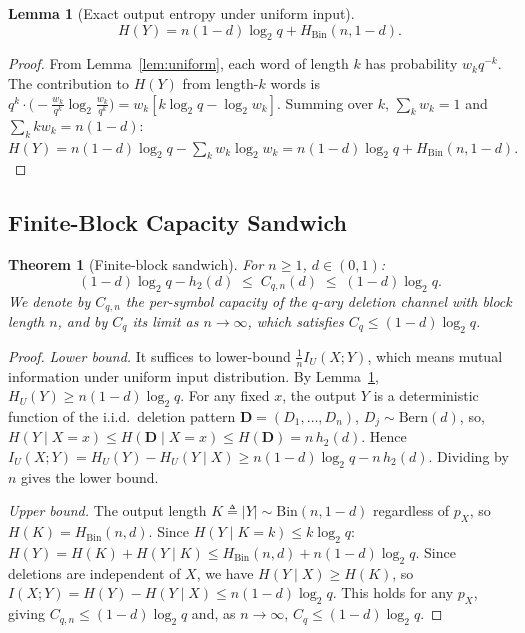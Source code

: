 \documentclass[conference]{IEEEtran}
\newtheorem{theorem}{Theorem}
\newtheorem{lemma}{Lemma}
\begin{document}
\begin{lemma}[Exact output entropy under uniform input]
\label{thm:HY}
\begin{equation}
  H(Y)=n(1-d)\log_2 q+H_{\mathrm{Bin}}(n,1-d).
  \label{eq:HY}
\end{equation}
\end{lemma}

\begin{proof}
From Lemma~\ref{lem:uniform}, each word of length $k$ has probability
$w_k q^{-k}$.  The contribution to $H(Y)$ from length-$k$ words is
$q^k\cdot\bigl(-\frac{w_k}{q^k}\log_2\frac{w_k}{q^k}\bigr)
=w_k[k\log_2 q-\log_2 w_k]$.
Summing over $k$, $\sum_k w_k=1$ and
$\sum_k kw_k=n(1-d)$:
\(
H(Y)=n(1-d)\log_2 q-\sum_k w_k\log_2 w_k
=n(1-d)\log_2 q+H_{\mathrm{Bin}}(n,1-d).
\)
\end{proof}

\subsection{Finite-Block Capacity Sandwich}

\begin{theorem}[Finite-block sandwich]
\label{thm:sandwich}
For $n\ge 1$, $d\in(0,1)$:
\begin{equation}
  (1-d)\log_2 q-h_2(d) \;\le\;C_{q,n} (d)\;\le\; (1-d)\log_2 q.
  \label{eq:sandwich}
\end{equation}
We denote by $C_{q,n}$ the per-symbol capacity of the $q$-ary 
deletion channel with block length $n$, and by $C_q$ its 
limit as $n\to\infty$, which satisfies
$C_q\le (1-d)\log_2 q$.
\end{theorem}

\begin{proof}
\textit{Lower bound.}
It suffices to lower-bound $\frac{1}{n}I_U(X;Y)$, which means mutual information under uniform input distribution.
By Lemma~\ref{thm:HY}, $H_U(Y)\ge n(1-d)\log_2 q$.
For any fixed $x$, the output $Y$ is a deterministic function of the i.i.d.\ deletion
pattern $\mathbf{D}=(D_1,\ldots,D_n)$, $D_j\sim\mathrm{Bern}(d)$,
so,
$H(Y\mid X=x)\le H(\mathbf{D}\mid X=x) \le H(\mathbf{D})=n\,h_2(d)$.
Hence
\(
  I_U(X;Y)=H_U(Y)-H_U(Y\mid X)
  \ge n(1-d)\log_2 q-n\,h_2(d).
\)
Dividing by $n$ gives the lower bound.

\textit{Upper bound.}
The output length $K\triangleq |Y|\sim\mathrm{Bin}(n,1-d)$ regardless of $p_X$,
so $H(K)=H_{\mathrm{Bin}}(n,d)$.  Since $H(Y\mid K=k)\le k\log_2 q$:
\(
H(Y)=H(K)+H(Y\mid K)\le H_{\mathrm{Bin}}(n,d)+n(1-d)\log_2 q.
\)
Since deletions are independent of $X$, we have $H(Y\mid X)\ge H(K)$,
so
\(
I(X;Y)=H(Y)-H(Y\mid X)\le n(1-d)\log_2 q.
\)
This holds for any $p_X$, giving $C_{q,n}\le(1-d)\log_2 q$ and,
as $n\to\infty$, $C_q\le(1-d)\log_2 q$.
\end{proof}
\end{document}
